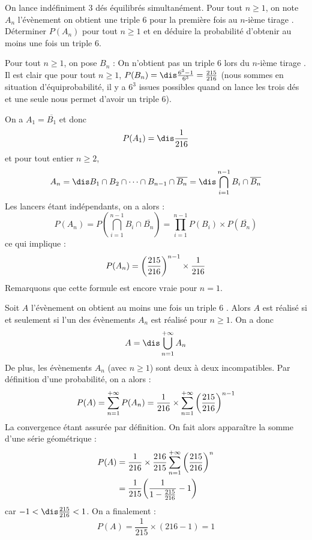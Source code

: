 \documentclass[a4paper,10pt]{report}
\begin{document}
\begin{Exa} On lance indéfiniment 3 dés équilibrés simultanément. Pour tout $n \geq 1$, on note $A_n$ l'évènement \og on obtient une triple 6 pour la première fois au $n$-ième tirage \fg . Déterminer $P(A_n)$ pour tout $n \geq 1$ et en déduire la probabilité d'obtenir au moins une fois un triple $6$.
\end{Exa}

\corr Pour tout $n \geq 1$, on pose $B_n$ : \og On n'obtient pas un triple 6 lors du $n$-ième tirage \fg . Il est clair que pour tout $n \geq 1$, $P(B_n) = \dis \frac{6^3-1}{6^3} = \frac{215}{216}$ (nous sommes en situation d'équiprobabilité, il y a $6^3$ issues possibles quand on lance les trois dés et une seule nous permet d'avoir un triple $6$).

\medskip

\noindent On a $A_1=\overline{B_1}$ et donc 
$$P(A_1) = \dis \frac{1}{216}$$
et pour tout entier $n \geq 2$, 
$$A_n = \dis B_1 \cap B_2 \cap \cdots \cap B_{n-1} \cap \overline{B_n} = \dis \bigcap_{i=1}^{n-1} B_i \cap \overline{B_n}$$
Les lancers étant indépendants, on a alors :
\[ P(A_n) = P(\bigcap_{i=1}^{n-1} B_i \cap \overline{B_n}) = \prod_{i=1}^{n-1} P(B_i) \times P( \overline{B_n})\]
ce qui implique :
\[ P(A_n) = \bigg{(} \frac{215}{216} \bigg{)}^{n-1} \times \frac{1}{216} \]
Remarquons que cette formule est encore vraie pour $n=1$.

\medskip
\noindent Soit $A$ l'évènement \og on obtient au moins une fois un triple $6$ \fg . Alors $A$ est réalisé si et seulement si l'un des évènements $A_n$ est réalisé pour $n \geq 1$. On a donc 
$$A= \dis \bigcup_{n=1}^{+ \infty} A_n$$
De plus, les évènements $A_n$ (avec $n \geq 1$) sont deux à deux incompatibles. Par définition d'une probabilité, on a alors :
\[ P(A) = \sum_{n=1}^{+ \infty} P(A_n) = \frac{1}{216} \times \sum_{n=1}^{+ \infty} \bigg{(} \frac{215}{216} \bigg{)}^{n-1} \]
La convergence étant assurée par définition. On fait alors apparaître la somme d'une série géométrique :
\begin{align*}
P(A) & = \frac{1}{216} \times \frac{216}{215} \sum_{n=1}^{+ \infty} \bigg{(} \frac{215}{216} \bigg{)}^{n} \\
& = \frac{1}{215} \bigg{(} \frac{1}{1-\frac{215}{216}} - 1 \bigg{)} 
\end{align*}
car $-1 < \dis \frac{215}{216} < 1$. On a finalement :
\[ P(A) = \frac{1}{215} \times (216-1) = 1 \]
\end{document}
